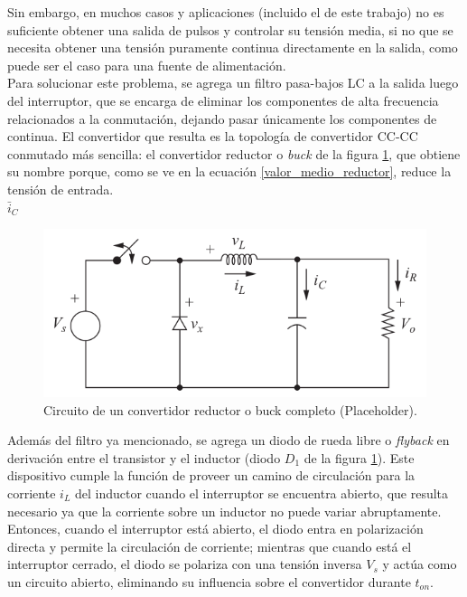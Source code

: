 Sin embargo, en muchos casos y aplicaciones (incluido el de este trabajo) no es suficiente obtener una salida de pulsos y controlar su tensión media, si no que se necesita obtener una tensión puramente continua directamente en la salida, como puede ser el caso para una fuente de alimentación.\\

Para solucionar este problema, se agrega un filtro pasa-bajos LC a la salida luego del interruptor, que se encarga de eliminar los componentes de alta frecuencia relacionados a la conmutación, dejando pasar únicamente los componentes de continua. El convertidor que resulta es la topología de convertidor CC-CC conmutado más sencilla: el {\Medium convertidor reductor} o {\Medium \textit{buck}} de la figura \ref{reductor}, que obtiene su nombre porque, como se ve en la ecuación \ref{valor_medio_reductor}, reduce la tensión de entrada.\\$\bar{i}_C$

\begin{figure}[H]
    \centering
    \includegraphics[scale=0.4]{Imagenes/Reductor.png}
    \caption{Circuito de un convertidor reductor o buck completo (Placeholder).}
    \label{reductor}
\end{figure}

Además del filtro ya mencionado, se agrega un diodo de rueda libre o \textit{flyback} en derivación entre el transistor y el inductor (diodo $D_1$ de la figura \ref{reductor}). Este dispositivo cumple la función de proveer un camino de circulación para la corriente $i_L$ del inductor cuando el interruptor se encuentra abierto, que resulta necesario ya que la corriente sobre un inductor no puede variar abruptamente. Entonces, cuando el interruptor está abierto, el diodo entra en polarización directa y permite la circulación de corriente; mientras que cuando está el interruptor cerrado, el diodo se polariza con una tensión inversa $V_s$ y actúa como un circuito abierto, eliminando su influencia sobre el convertidor durante $t_{on}$.\\

